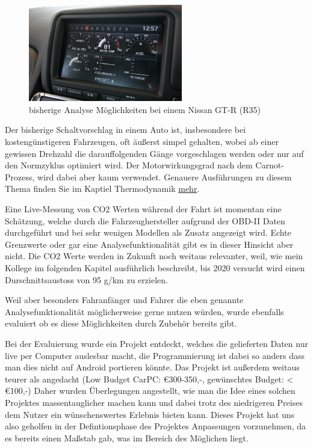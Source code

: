 \begin{figure}[!htb]\centering
	\includegraphics[width=0.6\textwidth]{images/gtrMultifunc}
	\caption{bisherige Analyse Möglichkeiten bei einem Nissan GT-R (R35) \cite{SIMR.CH1-Fahrstil-Analyse.GTRMultifunc}}\label{Fig:imgGTR}
\end{figure}

\newpage
Der bisherige Schaltvorschlag in einem Auto ist, insbesondere bei kostengünstigeren Fahrzeugen, oft äußerst simpel gehalten, wobei ab einer gewissen Drehzahl die darauffolgenden Gänge vorgeschlagen werden oder nur auf den Normzyklus optimiert wird. \cite{SIMR.CH1-Fahrstil-Analyse.Schaltempfehlung} Der Motorwirkungsgrad nach dem Carnot-Prozess, wird dabei aber kaum verwendet. \cite{SIMR.CH1-Fahrstil-Analyse.CarnotWirkungsgrad} Genauere Ausführungen zu diesem Thema finden Sie im Kaptiel Thermodynamik \hyperlink{subsubsection.2.1.2}{mehr}. 

Eine Live-Messung von CO2 Werten während der Fahrt ist momentan eine Schätzung, welche durch die Fahrzeughersteller aufgrund der OBD-II Daten durchgeführt und bei sehr wenigen Modellen als Zusatz angezeigt wird. Echte Grenzwerte oder gar eine Analysefunktionalität gibt es in dieser Hinsicht aber nicht. Die CO2 Werte werden in Zukunft noch weitaus relevanter, weil, wie mein Kollege im folgenden Kapitel ausführlich beschreibt, bis 2020 versucht wird einen Durschnittsaustoss von 95 g/km zu erzielen. \cite{SIMR.CH1-Fahrstil_Analyse.EUVerordCO2}

Weil aber besonders Fahranfänger und Fahrer die eben genannte Analysefunktionalität möglicherweise gerne nutzen würden, wurde ebenfalls evaluiert ob es diese Möglichkeiten durch Zubehör bereits gibt.

Bei der Evaluierung wurde ein Projekt entdeckt, welches die gelieferten Daten nur live per Computer auslesbar macht, die Programmierung ist dabei so anders dass man dies nicht auf Android portieren könnte. Das Projekt ist außerdem weitaus teurer als angedacht (Low Budget CarPC: €300-350,-, gewünschtes Budget: < €100,-) Daher wurden Überlegungen angestellt, wie man die Idee eines solchen Projektes massentauglicher machen kann und dabei trotz des niedrigeren Preises dem Nutzer ein wünschenswertes Erlebnis bieten kann. \cite{SIMR.CH1-Fahrstil-Analyse.LowBudgetCarPC} Dieses Projekt hat uns also geholfen in der Defintionsphase des Projektes Anpassungen vorzunehmen, da es bereits einen Maßstab gab, was im Bereich des Möglichen liegt.

